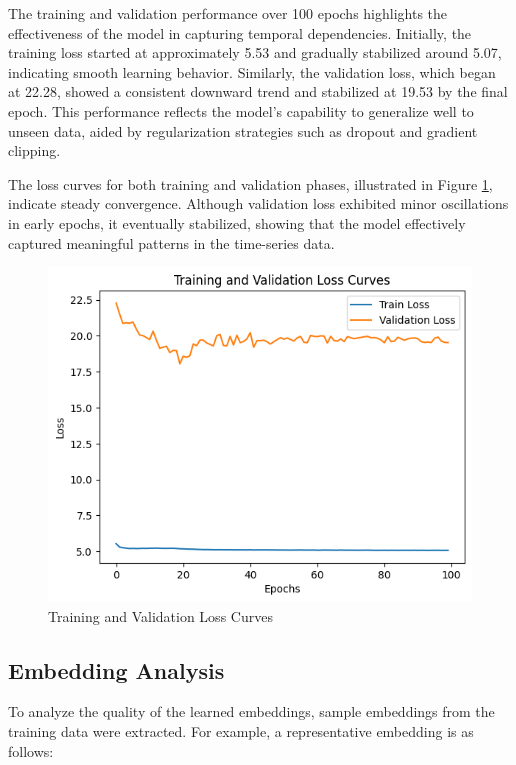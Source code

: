 \documentclass[twocolumn]{article}
\begin{document}
    The training and validation performance over 100 epochs highlights the
    effectiveness of the model in capturing temporal dependencies. Initially,
    the training loss started at approximately 5.53 and gradually stabilized
    around 5.07, indicating smooth learning behavior. Similarly, the validation loss,
    which began at 22.28, showed a consistent downward trend and stabilized at 19.53
    by the final epoch. This performance reflects the model's capability to
    generalize well to unseen data, aided by regularization strategies such as dropout
    and gradient clipping.

    The loss curves for both training and validation phases, illustrated in
    Figure \ref{fig:loss_curves}, indicate steady convergence. Although
    validation loss exhibited minor oscillations in early epochs, it eventually stabilized,
    showing that the model effectively captured meaningful patterns in the time-series
    data.

    \begin{figure}[ht]
        \centering
        \includegraphics[width=0.9\linewidth]{loss.png}
        \caption{Training and Validation Loss Curves}
        \label{fig:loss_curves}
    \end{figure}

    \subsection{Embedding Analysis}

    To analyze the quality of the learned embeddings, sample embeddings from the
    training data were extracted. For example, a representative embedding is as follows:
\end{document}
